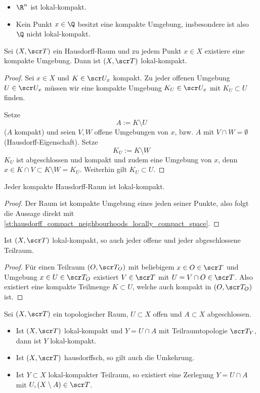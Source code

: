 \begin{ex}
	\begin{itemize}
		\item
			$\R^n$ ist lokal-kompakt.
		\item
			Kein Punkt $x\in \Q$ besitzt eine kompakte Umgebung, insbesondere ist also $\Q$ nicht lokal-kompakt.
	\end{itemize}
\end{ex}

\begin{st} \label{st:hausdorff_compact_neighbourhoods_locally_compact_space}
	Sei $(X, \scr T)$ ein Hausdorff-Raum und zu jedem Punkt $x \in X$ existiere eine kompakte Umgebung.
	Dann ist $(X, \scr T)$ lokal-kompakt.
	\begin{proof}
		Sei $x \in X$ und $K \in \scr U_x$ kompakt.
		Zu jeder offenen Umgebung $U \in \scr U_x$ müssen wir eine kompakte Umgebung $K_U \in \scr U_x$ mit $K_U \subset U$ finden.

		Setze
		\[
			A := K \setminus U
		\]
		($A$ kompakt) und seien $V, W$ offene Umgebungen von $x$, bzw. $A$ mit $V \cap W = \emptyset$ (Hausdorff-Eigenschaft).
		Setze
		\[
			K_U := K \setminus W
		\]
		$K_U$ ist abgeschlossen und kompakt und zudem eine Umgebung von $x$, denn $x \in K \cap V \subset K \setminus W = K_U$.
		Weiterhin gilt $K_U \subset U$.
	\end{proof}
\end{st}

\begin{kor}
	Jeder kompakte Hausdorff-Raum ist lokal-kompakt.
	\begin{proof}
		Der Raum ist kompakte Umgebung eines jeden seiner Punkte, also folgt die Aussage direkt mit \ref{st:hausdorff_compact_neighbourhoods_locally_compact_space}.
	\end{proof}
\end{kor}

\begin{lem}
	Ist $(X, \scr T)$ lokal-kompakt, so auch jeder offene und jeder abgeschlossene Teilraum.
	\begin{proof}
		Für einen Teilraum $(O, \scr T_O)$ mit beliebigem $x \in O \in \scr T$ und Umgebung $x \in U \in \scr T_O$ existiert $V \in \scr T$ mit $U = V \cap O \in \scr T$.
		Also existiert eine kompakte Teilmenge $K \subset U$, welche auch kompakt in $(O, \scr T_O)$ ist.
	\end{proof}
\end{lem}

\begin{st}
	Sei $(X, \scr T)$ ein topologischer Raum, $U \subset X$ offen und $A \subset X$ abgeschlossen.
	\begin{itemize}
		\item
			Ist $(X, \scr T)$ lokal-kompakt und $Y = U \cap A$ mit Teilraumtopologie $\scr T_Y$, dann ist $Y$ lokal-kompakt.
		\item
			Ist $(X, \scr T)$ hausdorffsch, so gilt auch die Umkehrung.
		\item
			Ist $Y \subset X$ lokal-kompakter Teilraum, so existiert eine Zerlegung $Y = U \cap A$ mit $U, (X \setminus A) \in \scr T$.
	\end{itemize}
\end{st}

